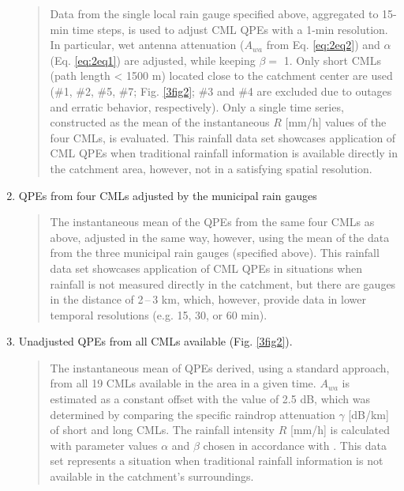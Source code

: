 \documentclass{ctuthesis}\usepackage[]{graphicx}\usepackage[]{color}
\begin{document}
\begin{enumerate}
                \begin{quote}
                Data from the single local rain gauge specified above, aggregated to 15-min time steps, is used to adjust \citep{fenclGaugeadjustedRainfallEstimates2017} CML QPEs with a 1-min resolution. In particular, wet antenna attenuation ($A_{wa}$ from Eq. \ref{eq:2eq2}) and $\alpha$ (Eq. \ref{eq:2eq1}) are adjusted, while keeping $\beta =$ 1. Only short CMLs (path length < 1500 m) located close to the catchment center are used (\#1, \#2, \#5, \#7; Fig. \ref{3fig2}; \#3 and \#4 are excluded due to outages and erratic behavior, respectively). Only a single time series, constructed as the mean of the instantaneous $R$ [mm/h] values of the four CMLs, is evaluated.
                This rainfall data set showcases application of CML QPEs when traditional rainfall information is available directly in the catchment area, however, not in a satisfying spatial resolution.
                \end{quote}
        \item QPEs from four CMLs adjusted by the municipal rain gauges 
                \begin{quote}
                The instantaneous mean of the QPEs from the same four CMLs as above, adjusted in the same way, however, using the mean of the data from the three municipal rain gauges (specified above).
                This rainfall data set showcases application of CML QPEs in situations when rainfall is not measured directly in the catchment, but there are gauges in the distance of 2\,--\,3 km, which, however, provide data in lower temporal resolutions (e.g. 15, 30, or 60 min).
                \end{quote}
        \item Unadjusted QPEs from all CMLs available (Fig. \ref{3fig2}).
                \begin{quote}
                The instantaneous mean of QPEs derived, using a standard approach, from all 19 CMLs available in the area in a given time. $A_{wa}$ is estimated as a constant offset with the value of 2.5 dB, which was determined by comparing the specific raindrop attenuation $\gamma$ [dB/km] of short and long CMLs. The rainfall intensity $R$ [mm/h] is calculated with parameter values $\alpha$ and $\beta$ chosen in accordance with \cite{recommendation2005838}.
                This data set represents a situation when traditional rainfall information is not available in the catchment's surroundings.
                \end{quote}
\end{enumerate}
\end{document}
